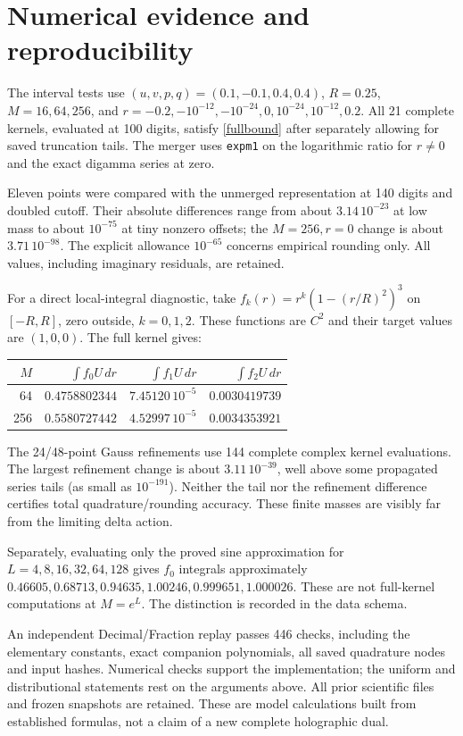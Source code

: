 \documentclass[11pt,a4paper]{article}
\begin{document}
\newpage
\section{Numerical evidence and reproducibility}
The interval tests use $(u,v,p,q)=(0.1,-0.1,0.4,0.4)$, $R=0.25$,
$M=16,64,256$, and
$r=-0.2,-10^{-12},-10^{-24},0,10^{-24},10^{-12},0.2$.
All 21 complete kernels, evaluated at 100 digits, satisfy
\eqref{fullbound} after separately allowing for saved truncation tails.
The merger uses \texttt{expm1} on the logarithmic ratio for $r\ne0$
and the exact digamma series at zero.

Eleven points were compared with the unmerged representation at
140 digits and doubled cutoff. Their absolute differences range
from about $3.14\,10^{-23}$ at low mass to about $10^{-75}$ at tiny
nonzero offsets; the $M=256,r=0$ change is about $3.71\,10^{-98}$.
The explicit allowance $10^{-65}$ concerns empirical rounding only.
All values, including imaginary residuals, are retained.

For a direct local-integral diagnostic, take
$f_k(r)=r^k(1-(r/R)^2)^3$ on $[-R,R]$, zero outside, $k=0,1,2$.
These functions are $C^2$ and their target values are $(1,0,0)$.
The full kernel gives:
\begin{center}
\begin{tabular}{rrrr}
\toprule
$M$ & $\int f_0 U\,dr$ & $\int f_1 U\,dr$ & $\int f_2 U\,dr$\\
\midrule
64 & $0.4758802344$ & $7.45120\,10^{-5}$ & $0.0030419739$\\
256 & $0.5580727442$ & $4.52997\,10^{-5}$ & $0.0034353921$\\
\bottomrule
\end{tabular}
\end{center}
The 24/48-point Gauss refinements use 144 complete complex kernel
evaluations. The largest refinement change is about $3.11\,10^{-39}$,
well above some propagated series tails (as small as $10^{-191}$).
Neither the tail nor the refinement difference certifies total
quadrature/rounding accuracy. These finite masses are visibly far
from the limiting delta action.

Separately, evaluating only the proved sine approximation for
$L=4,8,16,32,64,128$ gives $f_0$ integrals approximately
$0.46605,0.68713,0.94635,1.00246,0.999651,1.000026$.
These are not full-kernel computations at $M=e^L$.
The distinction is recorded in the data schema.

An independent Decimal/Fraction replay passes 446 checks, including
the elementary constants, exact companion polynomials, all saved
quadrature nodes and input hashes. Numerical checks support the
implementation; the uniform and distributional statements rest on
the arguments above. All prior scientific files and frozen snapshots
are retained. These are model calculations built from established
formulas, not a claim of a new complete holographic dual.
\end{document}

